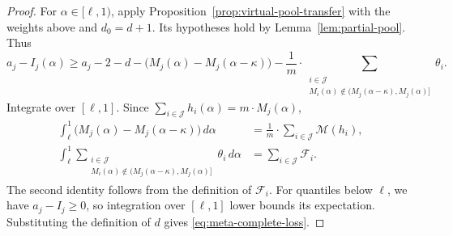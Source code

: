 \begin{proof}
For $\alpha\in[\ell,1)$, apply
Proposition~\ref{prop:virtual-pool-transfer} with the weights above and
$d_0=d+1$. Its hypotheses hold by Lemma~\ref{lem:partial-pool}. Thus
\[
 a_j-I_j(\alpha)\ge a_j-2-d-
 \bigl(M_j(\alpha)-M_j(\alpha-\kappa)\bigr)
 -\frac1m\cdot\sum_{\substack{i\in\mathcal J\\
 M_i(\alpha)\notin(M_j(\alpha-\kappa),M_j(\alpha)]}}\theta_i.
\]
Integrate over $[\ell,1]$. Since $\sum_{i\in\mathcal J} h_i(\alpha)=m\cdot M_j(\alpha)$,
\begin{align*}
 \int_\ell^1\!\bigl(M_j(\alpha)-M_j(\alpha-\kappa)\bigr)\,d\alpha
 &=\frac1m\cdot\sum_{i\in\mathcal J}\mathcal M(h_i),\\
 \int_\ell^1\sum_{\substack{i\in\mathcal J\\
 M_i(\alpha)\notin(M_j(\alpha-\kappa),M_j(\alpha)]}}\theta_i\,d\alpha
 &=\sum_{i\in\mathcal J}\mathcal F_i.
\end{align*}
The second identity follows from the definition of $\mathcal F_i$.
For quantiles below $\ell$, we have $a_j-I_j\ge0$, so integration over
$[\ell,1]$ lower bounds its expectation. Substituting the definition of $d$ gives
\eqref{eq:meta-complete-loss}.
\end{proof}

